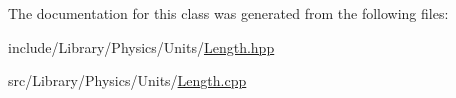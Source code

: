 The documentation for this class was generated from the following files\+:\begin{DoxyCompactItemize}
\item 
include/\+Library/\+Physics/\+Units/\hyperlink{_length_8hpp}{Length.\+hpp}\item 
src/\+Library/\+Physics/\+Units/\hyperlink{_length_8cpp}{Length.\+cpp}\end{DoxyCompactItemize}
